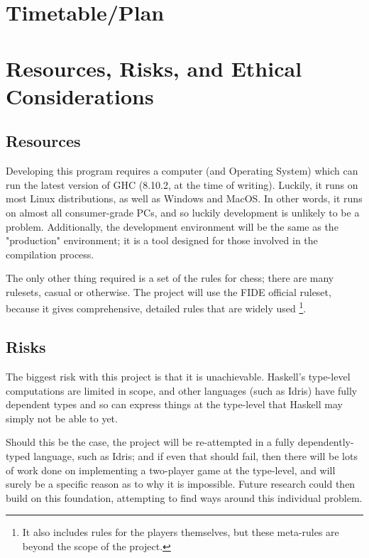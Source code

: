 \documentclass[12pt, a4paper]{scrartcl}
\begin{document}
\section{Timetable/Plan}


\section{Resources, Risks, and Ethical Considerations}

\subsection{Resources}

Developing this program requires a computer (and Operating System) which can run the latest version of GHC (8.10.2, at the time of writing). Luckily, it runs on most Linux distributions, as well as Windows and MacOS. In other words, it runs on almost all consumer-grade PCs, and so luckily development is unlikely to be a problem. Additionally, the development environment will be the same as the "production" environment; it is a tool designed for those involved in the compilation process.

The only other thing required is a set of the rules for chess; there are many rulesets, casual or otherwise. The project will use the FIDE official ruleset, because it gives comprehensive, detailed rules that are widely used \footnote{It also includes rules for the players themselves, but these meta-rules are beyond the scope of the project.}.

\subsection{Risks}

The biggest risk with this project is that it is unachievable. Haskell's type-level computations are limited in scope, and other languages (such as Idris) have fully dependent types and so can express things at the type-level that Haskell may simply not be able to yet.

Should this be the case, the project will be re-attempted in a fully dependently-typed language, such as Idris; and if even that should fail, then there will be lots of work done on implementing a two-player game at the type-level, and will surely be a specific reason as to why it is impossible. Future research could then build on this foundation, attempting to find ways around this individual problem.
\end{document}
